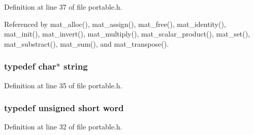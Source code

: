 Definition at line 37 of file portable.h.

Referenced by mat\_\-alloc(), mat\_\-assign(), mat\_\-free(), mat\_\-identity(), mat\_\-init(), mat\_\-invert(), mat\_\-multiply(), mat\_\-scalar\_\-product(), mat\_\-set(), mat\_\-substract(), mat\_\-sum(), and mat\_\-transpose().
\subsubsection{\setlength{\rightskip}{0pt plus 5cm}typedef char$\ast$ string}\label{portable_8h_a77}




Definition at line 35 of file portable.h.
\subsubsection{\setlength{\rightskip}{0pt plus 5cm}typedef unsigned short word}\label{portable_8h_a75}




Definition at line 32 of file portable.h.